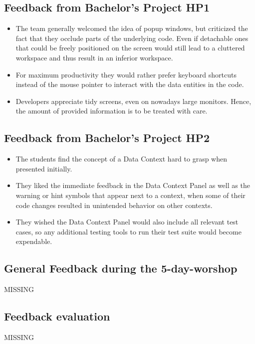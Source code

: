 \subsection{Feedback from Bachelor's Project HP1}
\label{subsec:FeedbackBPHP1}
\begin{itemize}
	\item The team generally welcomed the idea of popup windows, but criticized the fact that they occlude parts of the underlying code. Even if detachable ones that could be freely positioned on the screen would still lead to a cluttered workspace and thus result in an inferior workspace.

	\item For maximum productivity they would rather prefer keyboard shortcuts instead of the mouse pointer to interact with the data entities in the code.

	\item Developers appreciate tidy screens, even on nowadays large monitors. Hence, the amount of provided information is to be treated with care.
\end{itemize}

\subsection{Feedback from Bachelor's Project HP2}
\label{subsec:FeedbackBPHP2}
\begin{itemize}
	\item The students find the concept of a Data Context hard to grasp when presented initially.

	\item They liked the immediate feedback in the Data Context Panel as well as the warning or hint symbols that appear next to a context, when some of their code changes resulted in unintended behavior on other contexts.

	\item They wished the Data Context Panel would also include all relevant test cases, so any additional testing tools to run their test suite would become expendable.
\end{itemize}


\subsection{General Feedback during the 5-day-worshop}
\label{subsec:FeedbackWeek}
	MISSING

\subsection{Feedback evaluation}
\label{subsec:FeedbackEvaluation}
	MISSING


